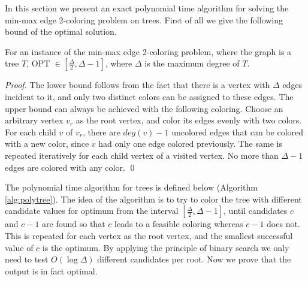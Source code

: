 \documentclass[runningheads, a4paper]{llncs}
\begin{document}
In this section we present an exact polynomial time algorithm for solving the min-max edge 2-coloring problem on trees. First of all we give the following bound of the optimal solution.

\begin{lemma}\label{lemma:minmax-opt-trees}
For an instance of the min-max edge 2-coloring problem, where the graph is a tree $T$, OPT $\in \left[ \frac{\Delta}{2}, \Delta-1 \right]$, where $\Delta$ is the maximum degree of $T$.
\end{lemma}
\begin{proof}
The lower bound follows from the fact that there is a vertex with $\Delta$ edges incident to it, and only two distinct colors can be assigned to these edges. The upper bound can always be achieved with the following coloring. Choose an arbitrary vertex $v_r$ as the root vertex, and color its edges evenly with two colors. For each child $v$ of $v_r$, there are $deg(v)-1$ uncolored edges that can be colored with a new color, since $v$ had only one edge colored previously. The same is repeated iteratively for each child vertex of a visited vertex. No more than $\Delta-1$ edges are colored with any color. \qed
\end{proof}

The polynomial time algorithm for trees is defined below (Algorithm \ref{alg:polytree}). The idea of the algorithm is to try to color the tree with different candidate values for optimum from the interval $\left[ \frac{\Delta}{2}, \Delta-1 \right]$, until candidates $c$ and $c-1$ are found so that $c$ leads to a feasible coloring whereas $c-1$ does not. This is repeated for each vertex as the root vertex, and the smallest successful value of $c$ is the optimum. By applying the principle of binary search we only need to test $O(\log \Delta)$ different candidates per root. Now we prove that the output is in fact optimal.
\end{document}
